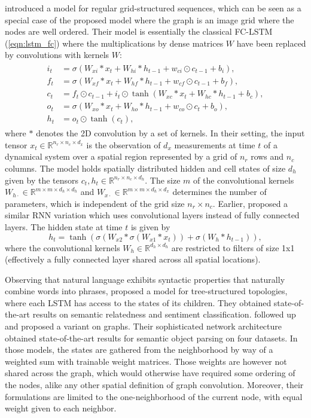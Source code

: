 \documentclass{article}
\newcommand{\R}{\mathbb{R}}
\newcommand{\eqnref}[1]{(\ref{eqn:#1})}
\begin{document}
\citet{convlstm} introduced a model for regular grid-structured sequences, which can be
seen as a special case of the proposed model where the graph is an image grid where the
nodes are well ordered. Their model is essentially the classical FC-LSTM
\eqnref{lstm_fc} where the multiplications by dense matrices $W$ have been
replaced by convolutions with kernels $W$:
\begin{align} \label{eqn:lstm_conv}
\begin{split}
i_t &= \sigma(W_{xi} \ast x_t + W_{hi} \ast h_{t-1} +
w_{ci} \odot c_{t-1} + b_i), \\
f_t &= \sigma(W_{xf} \ast x_t + W_{hf} \ast h_{t-1} +
w_{cf} \odot c_{t-1} + b_f), \\
c_t &= f_t \odot c_{t-1} + i_t \odot
\tanh(W_{xc} \ast x_t + W_{hc} \ast h_{t-1} + b_c), \\
o_t &= \sigma(W_{xo} \ast x_t + W_{ho} \ast h_{t-1} +
w_{co} \odot c_t + b_o), \\
h_t &= o_t \odot \tanh(c_t),
\end{split}
\end{align}
where $\ast$ denotes the 2D convolution by a set of kernels. In their setting,
the input tensor $x_t \in \R^{n_r \times n_c \times d_x}$ is the observation of
$d_x$ measurements at time $t$ of a dynamical system over a spatial region
represented by a grid of $n_r$ rows and $n_c$ columns. The model holds
spatially distributed hidden and cell states of size $d_h$ given by the tensors
$c_t, h_t \in \R^{n_r \times n_c \times d_h}$. The size $m$ of the
convolutional kernels $W_{h\cdot} \in \R^{m \times m \times d_h \times d_h}$
and $W_{x\cdot} \in \R^{m \times m \times d_h \times d_x}$ determines the
number of parameters, which is independent of the grid size $n_r \times n_c$.
Earlier, \citet{video_language_model} proposed a similar RNN variation which
uses convolutional layers instead of fully connected layers. The hidden state
at time $t$ is given by
\begin{equation}
	h_t = \tanh(\sigma(W_{x2} \ast \sigma(W_{x1} \ast x_t)) + \sigma(W_h \ast h_{t-1})),
\end{equation}
where the convolutional kernels $W_h \in \R^{d_h \times d_h}$ are restricted to
filters of size 1x1 (effectively a fully connected layer shared across all
spatial locations).

Observing that natural language exhibits syntactic properties that naturally
combine words into phrases, \citet{treelstm} proposed a model for
tree-structured topologies, where each LSTM has access to the states of its
children. They obtained state-of-the-art results on semantic relatedness and
sentiment classification. \citet{graphlstm} followed up and proposed a variant
on graphs. Their sophisticated network architecture obtained state-of-the-art
results for semantic object parsing on four datasets. In those models, the
states are gathered from the neighborhood by way of a weighted sum with
trainable weight matrices. Those weights are however not shared across the
graph, which would otherwise have required some ordering of the nodes, alike
any other spatial definition of graph convolution. Moreover, their formulations
are limited to the one-neighborhood of the current node, with equal weight
given to each neighbor.
\end{document}
